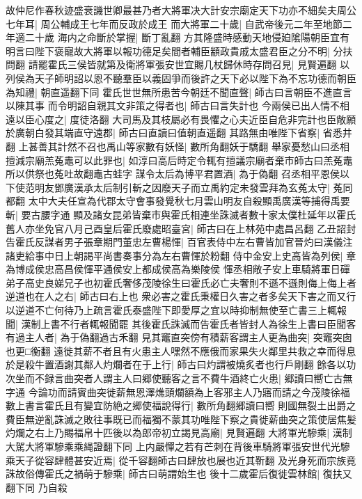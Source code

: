故仲尼作春秋迹盛衰譏世卿最甚乃者大將軍决大計安宗廟定天下功亦不細矣夫周公七年耳|{
	周公輔成王七年而反政於成王}
而大將軍二十歲|{
	自武帝後元二年至地節二年適二十歲}
海内之命斷於掌握|{
	斷丁亂翻}
方其隆盛時感動天地侵廹隂陽朝臣宜有明言曰陛下褒寵故大將軍以報功德足矣間者輔臣顓政貴戚太盛君臣之分不明|{
	分扶問翻}
請罷霍氏三侯皆就第及衛將軍張安世宜賜几杖歸休時存問召見|{
	見賢遍翻}
以列侯為天子師明詔以恩不聽羣臣以義固爭而後許之天下必以陛下為不忘功德而朝臣為知禮|{
	朝直遥翻下同}
霍氏世世無所患苦今朝廷不聞直聲|{
	師古曰言朝臣不進直言以陳其事}
而令明詔自親其文非策之得者也|{
	師古曰言失計也}
今兩侯已出人情不相遠以臣心度之|{
	度徒洛翻}
大司馬及其枝屬必有畏懼之心夫近臣自危非完計也臣敞願於廣朝白發其端直守遠郡|{
	師古曰直讀曰值朝直遥翻}
其路無由唯陛下省察|{
	省悉井翻}
上甚善其計然不召也禹山等家數有妖怪|{
	數所角翻妖于驕翻}
舉家憂愁山曰丞相擅減宗廟羔菟鼃可以此罪也|{
	如淳曰高后時定令輒有擅議宗廟者棄市師古曰羔菟鼃所以供祭也菟吐故翻鼃古蛙字}
謀令太后為博平君置酒|{
	為于偽翻}
召丞相平恩侯以下使范明友鄧廣漢承太后制引斬之因廢天子而立禹約定未發雲拜為玄菟太守|{
	菟同都翻}
太中大夫任宣為代郡太守會事發覺秋七月雲山明友自殺顯禹廣漢等捕得禹要斬|{
	要古腰字通}
顯及諸女昆弟皆棄市與霍氏相連坐誅滅者數十家太僕杜延年以霍氏舊人亦坐免官八月己酉皇后霍氏廢處昭臺宮|{
	師古曰在上林苑中處昌呂翻}
乙丑詔封告霍氏反謀者男子張章期門董忠左曹楊惲|{
	百官表侍中左右曹皆加官晉灼曰漢儀注諸吏給事中日上朝謁平尚書奏事分為左右曹惲於粉翻}
侍中金安上史高皆為列侯|{
	章為博成侯忠高昌侯惲平通侯安上都成侯高為樂陵侯}
惲丞相敞子安上車騎將軍日磾弟子高史良娣兄子也初霍氏奢侈茂陵徐生曰霍氏必亡夫奢則不遜不遜則侮上侮上者逆道也在人之右|{
	師古曰右上也}
衆必害之霍氏秉權日久害之者多矣天下害之而又行以逆道不亡何待乃上疏言霍氏泰盛陛下即愛厚之宜以時抑制無使至亡書三上輒報聞|{
	漢制上書不行者輒報聞罷}
其後霍氏誅滅而告霍氏者皆封人為徐生上書曰臣聞客有過主人者|{
	為于偽翻過古禾翻}
見其竈直突傍有積薪客謂主人更為曲突|{
	突竈突囱也更□衡翻}
遠徙其薪不者且有火患主人嘿然不應俄而家果失火鄰里共救之幸而得息於是殺牛置酒謝其鄰人灼爛者在于上行|{
	師古曰灼謂被燒炙者也行戶剛翻}
餘各以功次坐而不録言曲突者人謂主人曰郷使聽客之言不費牛酒終亡火患|{
	郷讀曰嚮亡古無字通}
今論功而請賓曲突徙薪無恩澤燋頭爛額為上客邪主人乃寤而請之今茂陵徐福數上書言霍氏且有變宜防絶之郷使福說得行|{
	數所角翻郷讀曰嚮}
則國無裂土出爵之費臣無逆亂誅滅之敗往事既已而福獨不蒙其功唯陛下察之貴徙薪曲突之策使居焦髪灼爛之右上乃賜福帛十匹後以為郎帝初立謁見高廟|{
	見賢遍翻}
大將軍光驂乘|{
	漢制大駕大將軍驂乘乘䋲證翻下同}
上内嚴憚之若有芒刺在背後車騎將軍張安世代光驂乘天子從容肆體甚安近焉|{
	從千容翻師古曰肆放也展也近其靳翻}
及光身死而宗族竟誅故俗傳霍氏之禍萌于驂乘|{
	師古曰萌謂始生也}
後十二歲霍后復徙雲林館|{
	復扶又翻下同}
乃自殺

